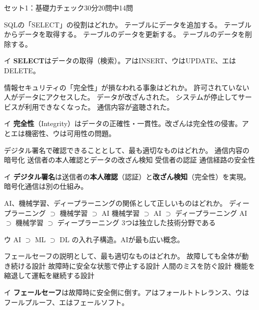 \begin{mogishi}{セット1：基礎力チェック}{30分}{20問中14問}
\begin{itpmon}[\diffbadge{基}]{SQLの「SELECT」の役割はどれか。}
\sentakushi
  {テーブルにデータを追加する。}
  {テーブルからデータを取得する。}
  {テーブルのデータを更新する。}
  {テーブルのデータを削除する。}
\end{itpmon}
\begin{kaisetsu}{イ}
\textbf{SELECT}はデータの取得（検索）。アはINSERT、ウはUPDATE、エはDELETE。
\end{kaisetsu}

\begin{itpmon}[\diffbadge{基}]{情報セキュリティの「完全性」が損なわれる事象はどれか。}
\sentakushi
  {許可されていない人がデータにアクセスした。}
  {データが改ざんされた。}
  {システムが停止してサービスが利用できなくなった。}
  {通信内容が盗聴された。}
\end{itpmon}
\begin{kaisetsu}{イ}
\textbf{完全性}（Integrity）はデータの正確性・一貫性。改ざんは完全性の侵害。アとエは機密性、ウは可用性の問題。
\end{kaisetsu}

\begin{itpmon}[\diffbadge{標}]{デジタル署名で確認できることとして、最も適切なものはどれか。}
\sentakushi
  {通信内容の暗号化}
  {送信者の本人確認とデータの改ざん検知}
  {受信者の認証}
  {通信経路の安全性}
\end{itpmon}
\begin{kaisetsu}{イ}
\textbf{デジタル署名}は送信者の\textbf{本人確認}（認証）と\textbf{改ざん検知}（完全性）を実現。暗号化通信は別の仕組み。
\end{kaisetsu}

\begin{itpmon}[\diffbadge{標}]{AI、機械学習、ディープラーニングの関係として正しいものはどれか。}
\sentakushi
  {ディープラーニング $\supset$ 機械学習 $\supset$ AI}
  {機械学習 $\supset$ AI $\supset$ ディープラーニング}
  {AI $\supset$ 機械学習 $\supset$ ディープラーニング}
  {3つは独立した技術分野である}
\end{itpmon}
\begin{kaisetsu}{ウ}
AI $\supset$ ML $\supset$ DL の入れ子構造。AIが最も広い概念。
\end{kaisetsu}

\begin{itpmon}[\diffbadge{基}]{フェールセーフの説明として、最も適切なものはどれか。}
\sentakushi
  {故障しても全体が動き続ける設計}
  {故障時に安全な状態で停止する設計}
  {人間のミスを防ぐ設計}
  {機能を縮退して運転を継続する設計}
\end{itpmon}
\begin{kaisetsu}{イ}
\textbf{フェールセーフ}は故障時に安全側に倒す。アはフォールトトレランス、ウはフールプルーフ、エはフェールソフト。
\end{kaisetsu}

\end{mogishi}

